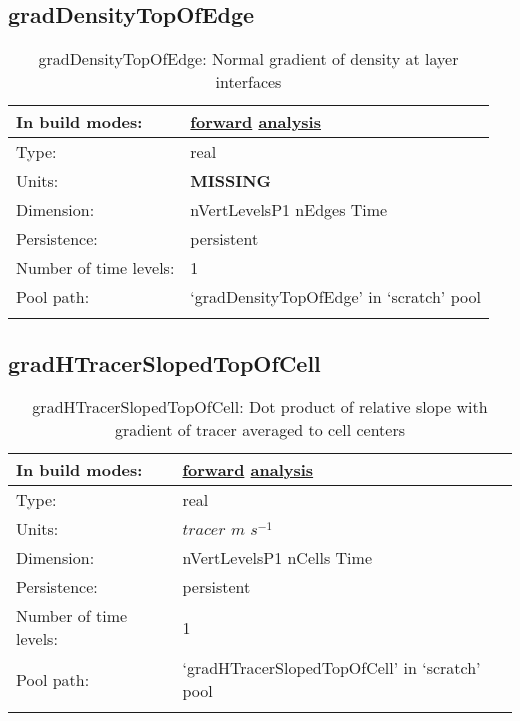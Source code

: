 \subsection[gradDensityTopOfEdge]{gradDensityTopOfEdge}
\label{subsec:var_sec_scratch_gradDensityTopOfEdge}
\begin{center}
\begin{longtable}{| p{2.0in} | p{4.0in} |}
        \hline 
        In build modes: & \hyperref[subsec:forward_var_tab_scratch]{forward} \hyperref[subsec:analysis_var_tab_scratch]{analysis} \\
        \hline 
        Type: & real \\
        \hline 
        Units: & {\bf \color{red} MISSING} \\
        \hline 
        Dimension: & nVertLevelsP1 nEdges Time \\
        \hline 
        Persistence: & persistent \\
        \hline 
        Number of time levels: & 1 \\
        \hline 
            Pool path: & `gradDensityTopOfEdge' in `scratch' pool \\
		 \hline 
    \caption{gradDensityTopOfEdge: Normal gradient of density at layer interfaces}
\end{longtable}
\end{center}
\subsection[gradHTracerSlopedTopOfCell]{gradHTracerSlopedTopOfCell}
\label{subsec:var_sec_scratch_gradHTracerSlopedTopOfCell}
\begin{center}
\begin{longtable}{| p{2.0in} | p{4.0in} |}
        \hline 
        In build modes: & \hyperref[subsec:forward_var_tab_scratch]{forward} \hyperref[subsec:analysis_var_tab_scratch]{analysis} \\
        \hline 
        Type: & real \\
        \hline 
        Units: & $tracer$ $m$ $s^{-1}$ \\
        \hline 
        Dimension: & nVertLevelsP1 nCells Time \\
        \hline 
        Persistence: & persistent \\
        \hline 
        Number of time levels: & 1 \\
        \hline 
            Pool path: & `gradHTracerSlopedTopOfCell' in `scratch' pool \\
		 \hline 
    \caption{gradHTracerSlopedTopOfCell: Dot product of relative slope with gradient of tracer averaged to cell centers}
\end{longtable}
\end{center}
